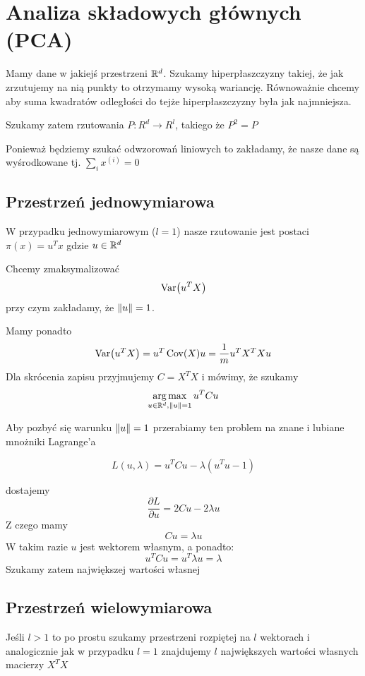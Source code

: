 \section{Analiza składowych głównych (PCA)}

Mamy dane w jakiejś przestrzeni \( \mathbb{R}^d \). Szukamy hiperpłaszczyzny takiej, że jak zrzutujemy na nią punkty to otrzymamy wysoką wariancję.
Równoważnie chcemy aby suma kwadratów odległości do tejże hiperpłaszczyzny była jak najmniejsza.

Szukamy zatem rzutowania \( P : R^d \rightarrow R^l \), takiego że \( P^2 = P \)

Ponieważ będziemy szukać odwzorowań liniowych to zakładamy, że nasze dane są wyśrodkowane tj. \( \sum_i x^{(i)} = 0 \)

\subsection{Przestrzeń jednowymiarowa}

W przypadku jednowymiarowym (\( l = 1 \)) nasze rzutowanie jest postaci \( \pi(x) = u^T x \) gdzie \( u \in \mathbb{R}^d \)

Chcemy zmaksymalizować 
\[
    \Var\pars{u^T X}
\]
przy czym zakładamy, że \( \left\Vert u \right\Vert = 1 \).

Mamy ponadto
\[
    \Var\pars{u^T X} = u^T \Cov(X) u = \frac{1}{m} u^TX^TXu
\]
Dla skrócenia zapisu przyjmujemy \( C = X^TX\) i mówimy, że szukamy
\[
    \operatorname*{arg\,max}_{u \in \mathbb{R}^d, \left\Vert u \right\Vert = 1} u^T C u
\]

Aby pozbyć się warunku \( \left\Vert u \right\Vert = 1 \) przerabiamy ten problem na znane i lubiane mnożniki Lagrange'a

\[
    L(u, \lambda) = u^T C u - \lambda(u^Tu - 1)
\]

dostajemy
\[
    \frac{\partial L}{\partial u} = 2Cu - 2 \lambda u
\]
Z czego mamy
\[
    Cu = \lambda u
\]
W takim razie \( u \) jest wektorem własnym, a ponadto:
\[
    u^T C u = u^T \lambda u = \lambda
\]
Szukamy zatem największej wartości własnej

\subsection{Przestrzeń wielowymiarowa}

Jeśli \( l > 1 \) to po prostu szukamy przestrzeni rozpiętej na \( l \) wektorach i analogicznie jak w przypadku \( l = 1 \) znajdujemy \( l \) największych wartości własnych macierzy \( X^TX \)


